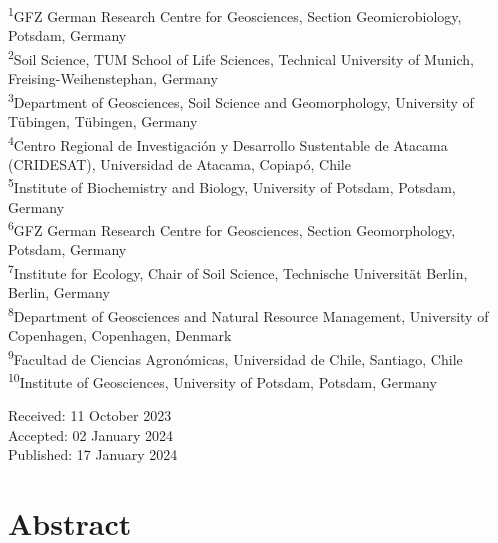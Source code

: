 \begin{scriptsize}
  \begin{justify}
      \textsuperscript{1}GFZ German Research Centre for Geosciences, Section Geomicrobiology, Potsdam, Germany\\
      \textsuperscript{2}Soil Science, TUM School of Life Sciences, Technical University of Munich, Freising-Weihenstephan, Germany\\
      \textsuperscript{3}Department of Geosciences, Soil Science and Geomorphology, University of T{\"u}bingen, T{\"u}bingen, Germany\\
      \textsuperscript{4}Centro Regional de Investigaci{\'o}n y Desarrollo Sustentable de Atacama (CRIDESAT), Universidad de Atacama, Copiap{\'o}, Chile\\
      \textsuperscript{5}Institute of Biochemistry and Biology, University of Potsdam, Potsdam, Germany\\
      \textsuperscript{6}GFZ German Research Centre for Geosciences, Section Geomorphology, Potsdam, Germany\\
      \textsuperscript{7}Institute for Ecology, Chair of Soil Science, Technische Universit{\"a}t Berlin, Berlin, Germany\\
      \textsuperscript{8}Department of Geosciences and Natural Resource Management, University of Copenhagen, Copenhagen, Denmark\\
      \textsuperscript{9}Facultad de Ciencias Agron{\'o}micas, Universidad de Chile, Santiago, Chile\\
      \textsuperscript{10}Institute of Geosciences, University of Potsdam, Potsdam, Germany
  \end{justify}
\end{scriptsize}

\vspace{0.4cm}
  
\begin{flushleft}
    Received: 11 October 2023\\
    Accepted: 02 January 2024\\
    Published: 17 January 2024
\end{flushleft}
  
\cleardoublepage
  
\section*{Abstract} %

